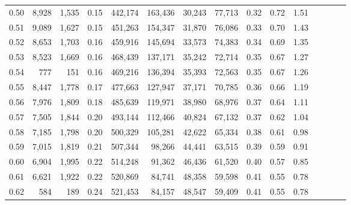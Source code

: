 \begin{tabular}{rrrcrrrrrrrrrrr}
0.50 &   8,928 &  1,535 &                                       0.15 &  442,174 &  163,436 &   30,243 &   77,713 &  0.32 &  0.72 &                         1.51 \\
0.51 &   9,089 &  1,627 &                                       0.15 &  451,263 &  154,347 &   31,870 &   76,086 &  0.33 &  0.70 &                         1.43 \\
0.52 &   8,653 &  1,703 &                                       0.16 &  459,916 &  145,694 &   33,573 &   74,383 &  0.34 &  0.69 &                         1.35 \\
0.53 &   8,523 &  1,669 &                                       0.16 &  468,439 &  137,171 &   35,242 &   72,714 &  0.35 &  0.67 &                         1.27 \\
0.54 &     777 &    151 &                                       0.16 &  469,216 &  136,394 &   35,393 &   72,563 &  0.35 &  0.67 &                         1.26 \\
0.55 &   8,447 &  1,778 &                                       0.17 &  477,663 &  127,947 &   37,171 &   70,785 &  0.36 &  0.66 &                         1.19 \\
0.56 &   7,976 &  1,809 &                                       0.18 &  485,639 &  119,971 &   38,980 &   68,976 &  0.37 &  0.64 &                         1.11 \\
0.57 &   7,505 &  1,844 &                                       0.20 &  493,144 &  112,466 &   40,824 &   67,132 &  0.37 &  0.62 &                         1.04 \\
0.58 &   7,185 &  1,798 &                                       0.20 &  500,329 &  105,281 &   42,622 &   65,334 &  0.38 &  0.61 &                         0.98 \\
0.59 &   7,015 &  1,819 &                                       0.21 &  507,344 &   98,266 &   44,441 &   63,515 &  0.39 &  0.59 &                         0.91 \\
0.60 &   6,904 &  1,995 &                                       0.22 &  514,248 &   91,362 &   46,436 &   61,520 &  0.40 &  0.57 &                         0.85 \\
0.61 &   6,621 &  1,922 &                                       0.22 &  520,869 &   84,741 &   48,358 &   59,598 &  0.41 &  0.55 &                         0.78 \\
0.62 &     584 &    189 &                                       0.24 &  521,453 &   84,157 &   48,547 &   59,409 &  0.41 &  0.55 &                         0.78 \\

\end{tabular}
